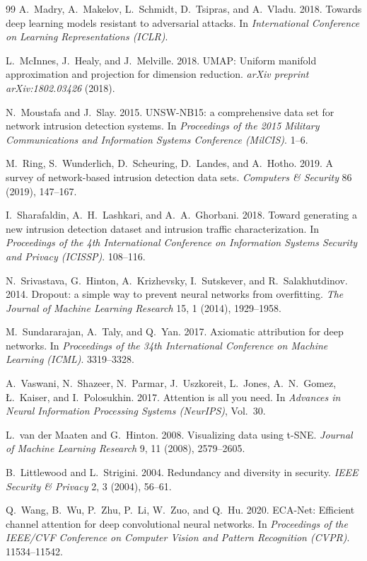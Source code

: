 \documentclass[sigconf]{acmart}
\begin{document}
\begin{thebibliography}{99}
A.\ Madry, A.\ Makelov, L.\ Schmidt, D.\ Tsipras, and A.\ Vladu. 2018. Towards deep learning models resistant to adversarial attacks. In \textit{International Conference on Learning Representations (ICLR)}.

L.\ McInnes, J.\ Healy, and J.\ Melville. 2018. UMAP: Uniform manifold approximation and projection for dimension reduction. \textit{arXiv preprint arXiv:1802.03426} (2018).

N.\ Moustafa and J.\ Slay. 2015. UNSW-NB15: a comprehensive data set for network intrusion detection systems. In \textit{Proceedings of the 2015 Military Communications and Information Systems Conference (MilCIS)}. 1--6.

M.\ Ring, S.\ Wunderlich, D.\ Scheuring, D.\ Landes, and A.\ Hotho. 2019. A survey of network-based intrusion detection data sets. \textit{Computers \& Security} 86 (2019), 147--167.

I.\ Sharafaldin, A.\ H.\ Lashkari, and A.\ A.\ Ghorbani. 2018. Toward generating a new intrusion detection dataset and intrusion traffic characterization. In \textit{Proceedings of the 4th International Conference on Information Systems Security and Privacy (ICISSP)}. 108--116.

N.\ Srivastava, G.\ Hinton, A.\ Krizhevsky, I.\ Sutskever, and R.\ Salakhutdinov. 2014. Dropout: a simple way to prevent neural networks from overfitting. \textit{The Journal of Machine Learning Research} 15, 1 (2014), 1929--1958.

M.\ Sundararajan, A.\ Taly, and Q.\ Yan. 2017. Axiomatic attribution for deep networks. In \textit{Proceedings of the 34th International Conference on Machine Learning (ICML)}. 3319--3328.

A.\ Vaswani, N.\ Shazeer, N.\ Parmar, J.\ Uszkoreit, L.\ Jones, A.\ N.\ Gomez, {\L}.\ Kaiser, and I.\ Polosukhin. 2017. Attention is all you need. In \textit{Advances in Neural Information Processing Systems (NeurIPS)}, Vol.\ 30.

L.\ van der Maaten and G.\ Hinton. 2008. Visualizing data using t-SNE. \textit{Journal of Machine Learning Research} 9, 11 (2008), 2579--2605.

B.\ Littlewood and L.\ Strigini. 2004. Redundancy and diversity in security. \textit{IEEE Security \& Privacy} 2, 3 (2004), 56--61.

Q.\ Wang, B.\ Wu, P.\ Zhu, P.\ Li, W.\ Zuo, and Q.\ Hu. 2020. ECA-Net: Efficient channel attention for deep convolutional neural networks. In \textit{Proceedings of the IEEE/CVF Conference on Computer Vision and Pattern Recognition (CVPR)}. 11534--11542.


\end{thebibliography}
\end{document}
